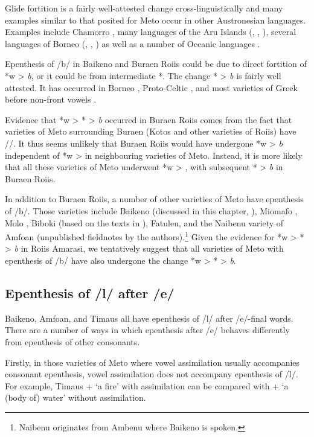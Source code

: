 \documentclass[output=paper]{langscibook}
\begin{document}
Glide fortition is a fairly well-attested change cross-linguistically
and many examples similar to that posited for Meto occur in other Austronesian languages.
Examples include Chamorro \citep[87]{bl00},
many languages of the Aru Islands (\cite[127--133]{co82}, \cite[55]{bl14}, \cite{ni17}),
several languages of Borneo
(\cite[73--76]{sm17}, ,
)
as well as a number of Oceanic languages \citep[137, 169, 321]{ro88}.

Epenthesis of /b/ in Baikeno and Buraen Roi{\Q}is
could be due to direct fortition of *w > \textit{b},
or it could be from intermediate *{\gw}.
The change *{\gw} > \textit{b} is fairly well attested.
It has occurred in Borneo \citep[612--613]{bl13},
Proto-Celtic \citep[9]{ma09},
and most varieties of Greek before non-front vowels \citep[156]{si95}.

Evidence that *w > *{\gw} > \textit{b} occurred in Buraen Roi{\Q}is   
comes from the fact that varieties of Meto surrounding Buraen
(Kotos and other varieties of Roi{\Q}is) have /\gw/.
It thus seems unlikely that Buraen Roi{\Q}is
would have undergone *w > \textit{b} independent of *w > \textit{\gw}
in neighbouring varieties of Meto.
Instead, it is more likely that all these varieties
of Meto underwent *w > \textit{\gw}, with subsequent
*{\gw} > \textit{b} in Buraen Roi{\Q}is.

In addition to Buraen Roi{\Q}is, a number of other varieties
of Meto have epenthesis of /b/.
Those varieties include Baikeno (discussed in this chapter, ),
Miomafo \citep[483]{st96b}, Molo \citep{mo21},
Biboki (based on the texts in \cite{ne05}), Fatule{\Q}u,
and the Nai{\Q}benu variety of Amfo{\Q}an
(unpublished fieldnotes by the authors).\footnote{%
		Nai{\Q}benu originates from Ambenu where Baikeno is spoken.}
Given the evidence for *w > *{\gw} > \textit{b}
in Roi{\Q}is Amarasi, we tentatively suggest
that all varieties of Meto with epenthesis of /b/
have also undergone the change *w > *{\gw} > \textit{b}.

\subsection{Epenthesis of /l/ after /e/}\label{sec:LIns}
Baikeno, Amfo{\Q}an, and Timaus all have epenthesis of /l/ after /e/-final words.
There are a number of ways in which epenthesis after /e/ 
behaves differently from epenthesis of other consonants.

Firstly, in those varieties of Meto where
vowel assimilation usually accompanies consonant epenthesis,
vowel assimilation does not accompany epenthesis of /l/.
For example, Timaus  +  {\ra}  `a fire' with assimilation
can be compared with  +  {\ra} 
`a (body of) water' without assimilation.
\end{document}
